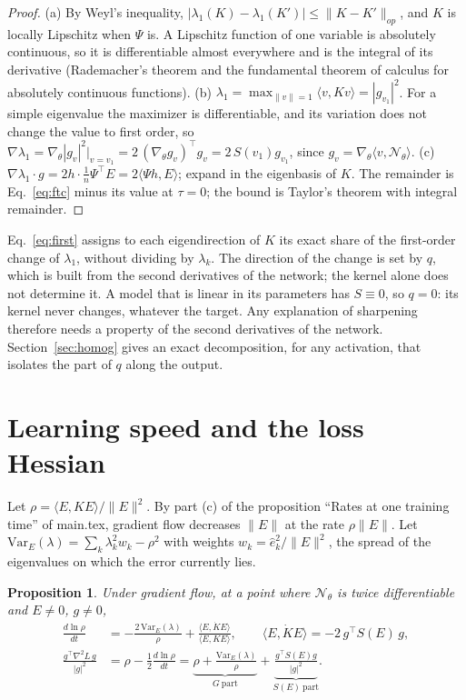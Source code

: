 \documentclass[11pt]{article}
\newtheorem{proposition}{Proposition}
\theoremstyle{definition}
\theoremstyle{remark}
\newcommand{\Net}{\mathcal{N}_\theta}
\newcommand{\ip}[2]{\langle #1,#2\rangle}
\begin{document}
\begin{proof}
(a) By Weyl's inequality, $|\lambda_1(K) - \lambda_1(K')| \le \|K - K'\|_{op}$, and $K$ is locally Lipschitz when $\Psi$ is.
A Lipschitz function of one variable is absolutely continuous, so it is differentiable almost everywhere and is the integral of its derivative (Rademacher's theorem and the fundamental theorem of calculus for absolutely continuous functions).
(b) $\lambda_1 = \max_{\|v\|=1}\ip{v}{Kv} = |g_{v_1}|^2$. For a simple eigenvalue the maximizer is differentiable, and its variation does not change the value to first order, so $\nabla\lambda_1 = \nabla_\theta|g_{v}|^2\big|_{v = v_1} = 2\,(\nabla_\theta g_v)^\top g_v = 2\,S(v_1)g_{v_1}$, since $g_v = \nabla_\theta\ip{v}{\Net}$.
(c) $\nabla\lambda_1\cdot g = 2h\cdot\frac1n\Psi^\top E = 2\ip{\Psi h}{E}$; expand in the eigenbasis of $K$. The remainder is Eq.~\eqref{eq:ftc} minus its value at $\tau = 0$; the bound is Taylor's theorem with integral remainder.
\end{proof}

Eq.~\eqref{eq:first} assigns to each eigendirection of $K$ its exact share of the first-order change of $\lambda_1$, without dividing by $\lambda_k$.
The direction of the change is set by $q$, which is built from the second derivatives of the network; the kernel alone does not determine it.
A model that is linear in its parameters has $S\equiv0$, so $q = 0$: its kernel never changes, whatever the target.
Any explanation of sharpening therefore needs a property of the second derivatives of the network.
Section~\ref{sec:homog} gives an exact decomposition, for any activation, that isolates the part of $q$ along the output.

\section{Learning speed and the loss Hessian}\label{sec:speed}

Let $\rho = \ip{E}{KE}/\|E\|^2$. By part (c) of the proposition ``Rates at one training time'' of main.tex, gradient flow decreases $\|E\|$ at the rate $\rho\|E\|$.
Let $\mathrm{Var}_E(\lambda) = \sum_k\lambda_k^2 w_k - \rho^2$ with weights $w_k = \hat e_k^2/\|E\|^2$, the spread of the eigenvalues on which the error currently lies.

\begin{proposition}\label{prop:speed}
Under gradient flow, at a point where $\Net$ is twice differentiable and $E\neq0$, $g\neq0$,
\begin{align}
\frac{d\ln\rho}{dt} &= -\frac{2\,\mathrm{Var}_E(\lambda)}{\rho} + \frac{\ip{E}{\dot KE}}{\ip{E}{KE}}, \qquad \ip{E}{\dot KE} = -2\,g^\top S(E)\,g, \label{eq:rho}\\
\frac{g^\top\nabla^2L\,g}{|g|^2} &= \rho - \frac12\frac{d\ln\rho}{dt} = \underbrace{\rho + \frac{\mathrm{Var}_E(\lambda)}{\rho}}_{G\ \text{part}} + \underbrace{\frac{g^\top S(E)g}{|g|^2}}_{S(E)\ \text{part}} . \label{eq:hg}
\end{align}
\end{proposition}
\end{document}

